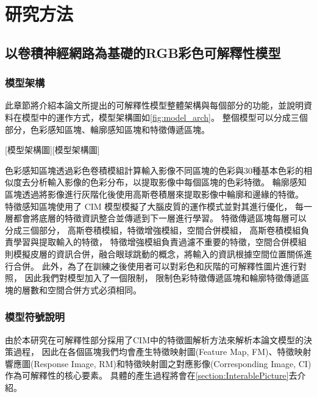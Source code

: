 \documentclass[class=NCU_thesis, crop=false]{standalone}
\begin{document}
\chapter{研究方法}

\section{以卷積神經網路為基礎的RGB彩色可解釋性模型}
\subsection{模型架構}

此章節將介紹本論文所提出的可解釋性模型整體架構與每個部分的功能，並說明資料在模型中的運作方式，模型架構圖如\cref{fig:model_arch}。
整個模型可以分成三個部分，色彩感知區塊、輪廓感知區塊和特徵傳遞區塊。

[模型架構圖][模型架構圖]


色彩感知區塊透過彩色卷積模組計算輸入影像不同區塊的色彩與30種基本色彩的相似度去分析輸入影像的色彩分布，以提取影像中每個區塊的色彩特徵。
輪廓感知區塊透過將影像進行灰階化後使用高斯卷積層來提取影像中輪廓和邊緣的特徵。
特徵感知區塊使用了 CIM 模型模擬了大腦皮質的運作模式並對其進行優化，
每一層都會將底層的特徵資訊整合並傳遞到下一層進行學習。 
特徵傳遞區塊每層可以分成三個部分，
高斯卷積模組，特徵增強模組，空間合併模組，
高斯卷積模組負責學習與提取輸入的特徵，
特徵增強模組負責過濾不重要的特徵，空間合併模組則模擬皮層的資訊合併，融合眼球跳動的概念，將輸入的資訊根據空間位置關係進行合併。
此外，為了在訓練之後使用者可以對彩色和灰階的可解釋性圖片進行對照，
因此我們對模型加入了一個限制，
限制色彩特徵傳遞區塊和輪廓特徵傳遞區塊的層數和空間合併方式必須相同。
\pagebreak
\subsection{模型符號說明}
	由於本研究在可解釋性部分採用了CIM中的特徵圖解析方法來解析本論文模型的決策過程，
	因此在各個區塊我們均會產生特徵映射圖(Feature Map, FM)、特徵映射響應圖(Response Image, RM)和特徵映射圖之對應影像(Corresponding Image, CI)作為可解釋性的核心要素。
	具體的產生過程將會在\cref{section:InterablePicture}去介紹。
\end{document}
